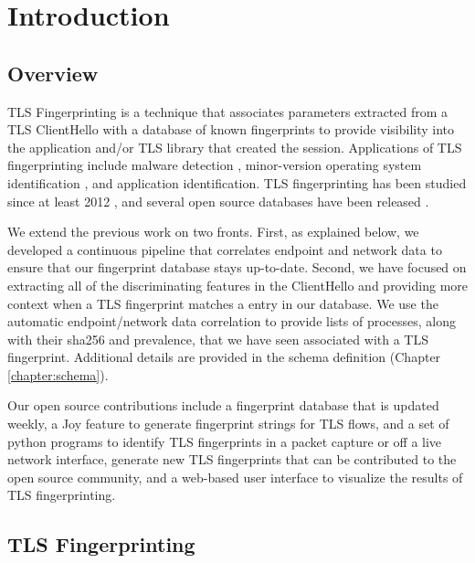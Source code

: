 \documentclass{book}
\begin{document}
\mainmatter

\tableofcontents


\chapter{Introduction}


\section{Overview}

TLS Fingerprinting is a technique that associates parameters extracted from a TLS ClientHello with a database of known fingerprints to provide visibility into the application and/or TLS library that created the session. Applications of TLS fingerprinting include malware detection \cite{anderson17deciphering}, minor-version operating system identification \cite{anderson17os}, and application identification. TLS fingerprinting has been studied since at least 2012 \cite{p0f2012tls}, and several open source databases have been released \cite{ja3,brotherston2015tls,kotzias2018tlsfingerprinting}. 

We extend the previous work on two fronts. First, as explained below, we developed a continuous pipeline that correlates endpoint and network data to ensure that our fingerprint database stays up-to-date. Second, we have focused on extracting all of the discriminating features in the ClientHello and providing more context when a TLS fingerprint matches a entry in our database. We use the automatic endpoint/network data correlation to provide lists of processes, along with their sha256 and prevalence, that we have seen associated with a TLS fingerprint. Additional details are provided in the schema definition (Chapter \ref{chapter:schema}).

Our open source contributions include a fingerprint database that is updated weekly, a Joy feature to generate fingerprint strings for TLS flows, and a set of python programs to identify TLS fingerprints in a packet capture or off a live network interface, generate new TLS fingerprints that can be contributed to the open source community, and a web-based user interface to visualize the results of TLS fingerprinting.

\section{TLS Fingerprinting}
\end{document}
